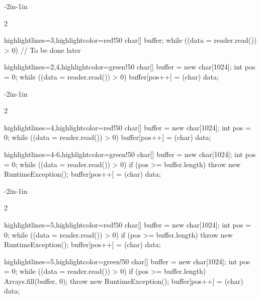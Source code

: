 \documentclass{article}
\begin{document}
\flush

\newenvironment{snippet}
  {\begin{adjustwidth}{-2in}{-1in}\setstretch{0.85}\begin{multicols}{2}\small}
  {\end{multicols}\end{adjustwidth}\flush}

\begin{snippet}
\begin{ffcode*}{highlightlines={3},highlightcolor=red!50}
char[] buffer;
while ((data = reader.read()) > 0) {
  // To be done later
}
\end{ffcode*}
\columnbreak
\begin{ffcode*}{highlightlines={2,4},highlightcolor=green!50}
char[] buffer = new char[1024];
int pos = 0;
while ((data = reader.read()) > 0) {
  buffer[pos++] = (char) data;
}
\end{ffcode*}
\end{snippet}

\newpage
{}
\begin{snippet}
\begin{ffcode*}{highlightlines={4},highlightcolor=red!50}
char[] buffer = new char[1024];
int pos = 0;
while ((data = reader.read()) > 0) {
  buffer[pos++] = (char) data;
}
\end{ffcode*}
\columnbreak
\begin{ffcode*}{highlightlines={4-6},highlightcolor=green!50}
char[] buffer = new char[1024];
int pos = 0;
while ((data = reader.read()) > 0) {
  if (pos >= buffer.length) {
    throw new RuntimeException();
  }
  buffer[pos++] = (char) data;
}
\end{ffcode*}
\end{snippet}

\newpage
{}
\begin{snippet}
\begin{ffcode*}{highlightlines={5},highlightcolor=red!50}
char[] buffer = new char[1024];
int pos = 0;
while ((data = reader.read()) > 0) {
  if (pos >= buffer.length) {
    throw new RuntimeException();
  }
  buffer[pos++] = (char) data;
}
\end{ffcode*}
\columnbreak
\begin{ffcode*}{highlightlines={5},highlightcolor=green!50}
char[] buffer = new char[1024];
int pos = 0;
while ((data = reader.read()) > 0) {
  if (pos >= buffer.length) {
    Arrays.fill(buffer, 0);
    throw new RuntimeException();
  }
  buffer[pos++] = (char) data;
}
\end{ffcode*}
\end{snippet}
\end{document}
